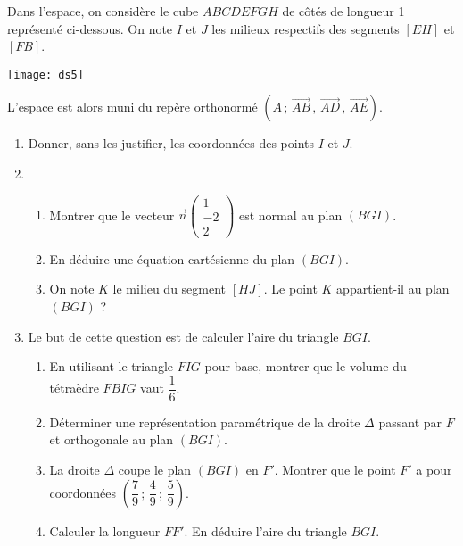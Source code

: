 \documentclass[11pt,fleqn, openany]{book} %
\begin{document}
%

    
 

\begin{exercise}Dans l'espace, on considère le cube $ABCDEFGH$ de côtés de longueur 1 représenté ci-dessous.
On note $I$ et $J$ les milieux respectifs des segments $[EH]$ et $[FB]$.

\begin{center}
\texttt{[image: ds5]}
\end{center}

L'espace est alors muni du repère orthonormé $(A\, ;\, \overrightarrow{AB}\, , \, \overrightarrow{AD} \, , \, \overrightarrow{AE})$.

\begin{enumerate}
\item Donner, sans les justifier, les coordonnées des points $I$ et $J$.
\vskip5pt
\item \begin{enumerate}
\item Montrer que le vecteur $\vec n \begin{pmatrix} 1 \\ -2 \\ 2 \end{pmatrix}$ est normal au plan $(BGI)$.
\item En déduire une équation cartésienne du plan $(BGI)$.
\item On note $K$ le milieu du segment $[HJ]$. Le point $K$ appartient-il au plan $(BGI)$ ?
\end{enumerate}
\item Le but de cette question est de calculer l'aire du triangle $BGI$.
\begin{enumerate}
\item En utilisant le triangle $FIG$ pour base, montrer que le volume du tétraèdre $FBIG$ vaut $\dfrac{1}{6}$.
\item Déterminer une représentation paramétrique de la droite $\Delta$ passant par $F$ et orthogonale au plan $(BGI)$.
\item La droite $\Delta$ coupe le plan $(BGI)$ en $F'$. Montrer que le point $F'$ a pour coordonnées $\left(\dfrac{7}{9} \, ;\, \dfrac{4}{9} \,;\, \dfrac{5}{9}\right)$.
\item Calculer la longueur $FF'$. En déduire l'aire du triangle $BGI$.
\end{enumerate} \end{enumerate}
\end{exercise}
\end{document}
